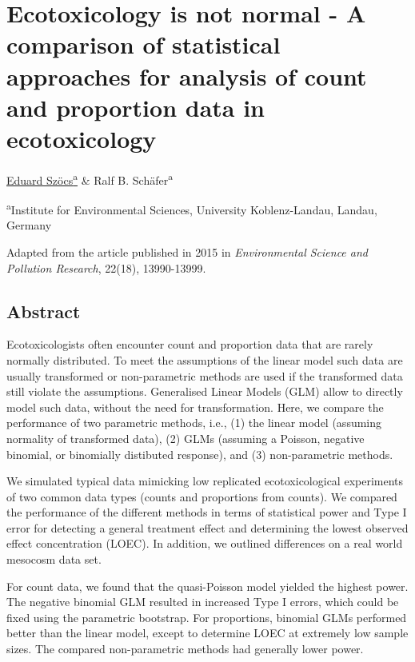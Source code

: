 
\chapter[Ecotoxicology is not normal]{Ecotoxicology is not normal - A comparison of statistical approaches for analysis of count and proportion data in ecotoxicology}
\label{sec:usetheglm} 
 
\begin{sloppypar}
\bigskip
\underline{Eduard Szöcs\textsuperscript{a}} \& Ralf B. Schäfer\textsuperscript{a}

\bigskip
\small
\noindent 
\textsuperscript{a}Institute for Environmental Sciences, University Koblenz-Landau, Landau, Germany 

\bigskip 
\normalsize
\noindent
Adapted from the article published in 2015 in \emph{Environmental Science and Pollution Research}, 22(18), 13990-13999.

\end{sloppypar}
\cleardoublepage


\section{Abstract}
\label{sec:usetheglm:abstract} 
Ecotoxicologists often encounter count and proportion data that are rarely normally distributed.
To meet the assumptions of the linear model such data are usually transformed or non-parametric methods are used if the transformed data still violate the assumptions.
Generalised Linear Models (GLM) allow to directly model such data, without the need for transformation.
Here, we compare the performance of  two parametric methods, i.e.,  (1) the linear model (assuming normality of transformed data), (2) GLMs (assuming a Poisson, negative binomial, or binomially distibuted response), and (3) non-parametric methods.

We simulated typical data mimicking low replicated ecotoxicological experiments of two common data types (counts and proportions from counts). 
We compared the performance of the different methods in terms of statistical power and Type I error for detecting a general treatment effect and determining the lowest observed effect concentration (LOEC).
In addition, we outlined differences on a real world mesocosm data set.

For count data, we found that the quasi-Poisson model yielded the highest power. The negative binomial GLM resulted in increased Type I errors, which could be fixed using the parametric bootstrap. 
For proportions, binomial GLMs performed better than the linear model, except to determine LOEC at extremely low sample sizes.
The compared non-parametric methods had generally lower power.

